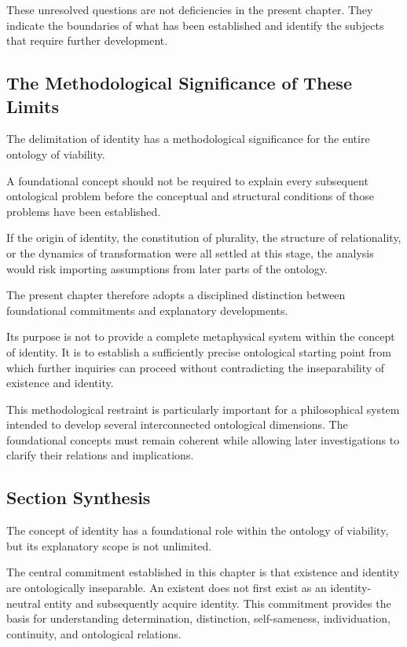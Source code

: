 These unresolved questions are not deficiencies in the present chapter. They indicate the boundaries of what has been established and identify the subjects that require further development.



\subsection{The Methodological Significance of These Limits}

The delimitation of identity has a methodological significance for the entire ontology of viability.

A foundational concept should not be required to explain every subsequent ontological problem before the conceptual and structural conditions of those problems have been established.

If the origin of identity, the constitution of plurality, the structure of relationality, or the dynamics of transformation were all settled at this stage, the analysis would risk importing assumptions from later parts of the ontology.

The present chapter therefore adopts a disciplined distinction between foundational commitments and explanatory developments.

Its purpose is not to provide a complete metaphysical system within the concept of identity. It is to establish a sufficiently precise ontological starting point from which further inquiries can proceed without contradicting the inseparability of existence and identity.

This methodological restraint is particularly important for a philosophical system intended to develop several interconnected ontological dimensions. The foundational concepts must remain coherent while allowing later investigations to clarify their relations and implications.

\subsection{Section Synthesis}

The concept of identity has a foundational role within the ontology of viability, but its explanatory scope is not unlimited.

The central commitment established in this chapter is that existence and identity are ontologically inseparable. An existent does not first exist as an identity-neutral entity and subsequently acquire identity. This commitment provides the basis for understanding determination, distinction, self-sameness, individuation, continuity, and ontological relations.


